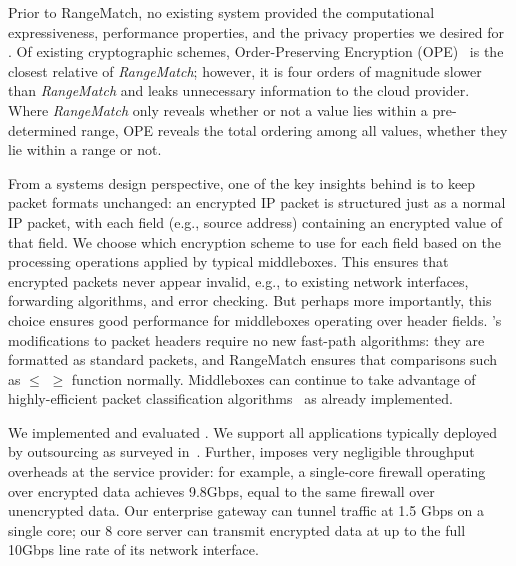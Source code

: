     Prior to RangeMatch, no existing system provided the computational expressiveness, performance properties, and the privacy properties we desired for \sys.
    Of existing cryptographic schemes, Order-Preserving Encryption (OPE)~\cite{boldyreva:ope,popa:mope,popa:cryptdb} is the closest relative of {\it RangeMatch}; however, it is four orders of magnitude slower than {\it RangeMatch} and leaks unnecessary information to the cloud provider.
    Where {\em RangeMatch} only reveals whether or not a value lies within a pre-determined range, OPE reveals the total ordering among all values, whether they lie within a range or not.

  From a systems design perspective, one of the key insights behind \sys is to keep packet formats unchanged: an encrypted IP packet is structured just as a normal IP packet, with each field (e.g., source address) containing an encrypted value of that field.
  We choose which encryption scheme to use for each field based on the processing operations applied by typical middleboxes.
  This ensures that encrypted packets never appear invalid, e.g., to existing network interfaces, forwarding algorithms, and error checking. 
  But perhaps more importantly, this choice ensures good performance for middleboxes operating over header fields. 
  \sys's modifications to packet headers require no new fast-path algorithms: they are formatted as standard packets, and RangeMatch ensures that comparisons such as $\leq$ $\geq$ function normally.
  Middleboxes can continue to take advantage of highly-efficient packet classification algorithms~\cite{packet_classif} as already implemented.
  

We implemented and evaluated \sys. We support all applications typically deployed by outsourcing as surveyed in~\cite{aplomb}.
Further, \sys imposes very negligible throughput overheads at the service provider: for example, a single-core firewall operating over encrypted data achieves 9.8Gbps, equal to the same firewall over unencrypted data.
Our enterprise gateway can tunnel traffic at 1.5 Gbps on a single core;  our 8 core server can transmit \sys encrypted data at up to the full 10Gbps line rate of its network interface.

